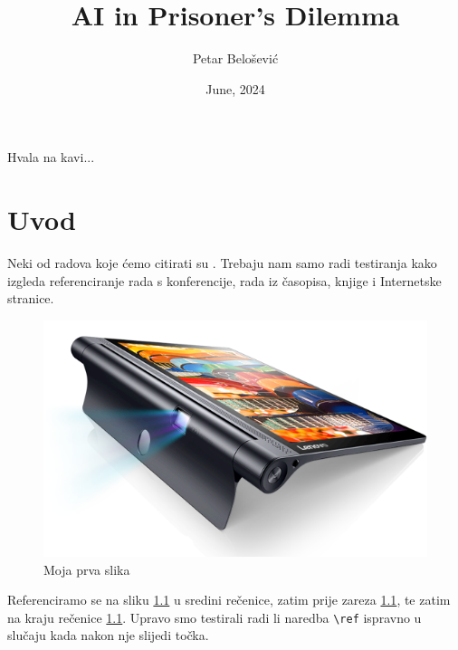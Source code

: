 \documentclass[zavrsnirad]{fer}
\title{AI in Prisoner's Dilemma}
\author{Petar Belošević}
\date{June, 2024}
\begin{document}
\maketitle






\begin{zahvale}
  Hvala na kavi...
\end{zahvale}


\mainmatter


\tableofcontents


\chapter{Uvod}
\label{pog:uvod}

Neki od radova koje ćemo citirati su \cite{6248073,6247753,ghiglia_pritt_phase_unwrapping,hartley2003multiple,4250461,123DCatch}.
Trebaju nam samo radi testiranja kako izgleda referenciranje rada s konferencije, rada iz časopisa, knjige i Internetske stranice.

\begin{figure}[htb]
  \centering
  \includegraphics[width=0.38\linewidth]{Figures/lenovo_yoga_tab3_pro_front.png} 
  \caption{Moja prva slika}
  \label{slk:prvaslika}
\end{figure}

Referenciramo se na sliku \ref{slk:prvaslika} u sredini rečenice, zatim prije zareza \ref{slk:prvaslika}, te zatim na kraju rečenice \ref{slk:prvaslika}.
Upravo smo testirali radi li naredba \verb|\ref| ispravno u slučaju kada nakon nje slijedi točka.
\end{document}
